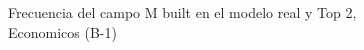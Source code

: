 \begin{figure}[H]
    \centering
    
    \caption{Frecuencia del campo M built en el modelo real y Top 2, Economicos (B-1)}
    \label{frecuency-M Built-top2}
\end{figure}